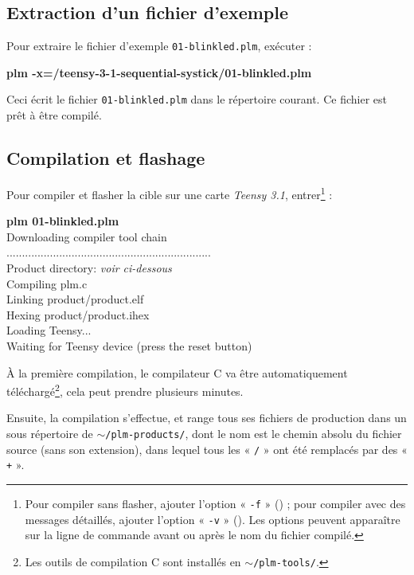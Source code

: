 \subsection{Extraction d'un fichier d'exemple}

Pour extraire le fichier d'exemple \texttt{01-blinkled.plm}, exécuter :

\begin{SHELL}
\bfseries plm -x=/teensy-3-1-sequential-systick/01-blinkled.plm
\end{SHELL}


Ceci écrit le fichier \texttt{01-blinkled.plm} dans le répertoire courant. Ce fichier est prêt à être compilé.

\subsection{Compilation et flashage}

Pour compiler et flasher la cible sur une carte \emph{Teensy 3.1}, entrer\footnote{Pour compiler sans flasher, ajouter l'option « \texttt{-f} » () ; pour compiler avec des messages détaillés, ajouter l'option « \texttt{-v} » (). Les options peuvent apparaître sur la ligne de commande avant ou après le nom du fichier compilé.} :
\begin{SHELL}
{\bfseries plm 01-blinkled.plm}\\
Downloading compiler tool chain\\
..................................................................\\
Product directory: \emph{voir ci-dessous}\\
Compiling plm.c\\
Linking product/product.elf\\
Hexing product/product.ihex\\
Loading Teensy...\\
Waiting for Teensy device (press the reset button)
\end{SHELL}

À la première compilation, le compilateur C va être automatiquement téléchargé\footnote{Les outils de compilation C sont installés en \texttt{$\sim$/plm-tools/}.}, cela peut prendre plusieurs minutes.

Ensuite, la compilation s'effectue, et range tous ses fichiers de production dans un sous répertoire de \texttt{$\sim$/plm-products/}, dont le nom est le  chemin absolu du fichier source (sans son extension), dans lequel tous les « \texttt{/} » ont été remplacés par des « \texttt{+} ».

